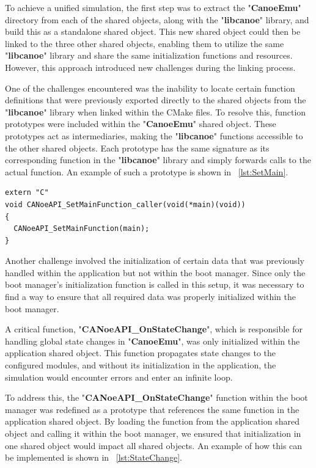 To achieve a unified simulation, the first step was to extract the "\textbf{CanoeEmu}" directory from each of the shared objects, along with the "\textbf{libcanoe}" library,  and build this as a standalone shared object. This new shared object could then be linked to the three other shared objects, enabling them to utilize the same "\textbf{libcanoe}" library and share the same initialization functions and resources. However, this approach introduced new challenges during the linking process.

One of the challenges encountered was the inability to locate certain function definitions that were previously exported directly to the shared objects from the "\textbf{libcanoe}" library when linked within the CMake files. To resolve this, function prototypes were included within the "\textbf{CanoeEmu}" shared object. These prototypes act as intermediaries, making the "\textbf{libcanoe}" functions accessible to the other shared objects. Each prototype has the same signature as its corresponding function in the "\textbf{libcanoe}" library and simply forwards calls to the actual function. An example of such a prototype is shown in ~\autoref{lst:SetMain}.
\newpage
\begin{lstlisting}[caption={SetMainFunction Prototype.}, label={lst:SetMain}]
extern "C"  
void CANoeAPI_SetMainFunction_caller(void(*main)(void))
{
  CANoeAPI_SetMainFunction(main);
}
\end{lstlisting}

Another challenge involved the initialization of certain data that was previously handled within the application but not within the boot manager. Since only the boot manager’s initialization function is called in this setup, it was necessary to find a way to ensure that all required data was properly initialized within the boot manager.

A critical function, "\textbf{CANoeAPI\_OnStateChange}", which is responsible for handling global state changes in "\textbf{CanoeEmu}", was only initialized within the application shared object. This function propagates state changes to the configured modules, and without its initialization in the application, the simulation would encounter errors and enter an infinite loop.

To address this, the "\textbf{CANoeAPI\_OnStateChange}" function within the boot manager was redefined as a prototype that references the same function in the application shared object. By loading the function from the application shared object and calling it within the boot manager, we ensured that initialization in one shared object would impact all shared objects. An example of how this can be implemented is shown in ~\autoref{lst:StateChange}.


